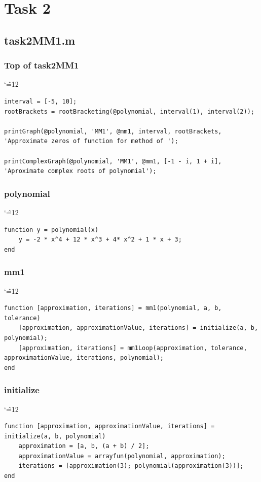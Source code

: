 \documentclass[12pt]{report}
\newenvironment{simplechar}{%
   \catcode`\^=12
}{}
\begin{document}
\newpage
\section{Task 2}

\subsection{task2MM1.m}

\subsubsection{Top of task2MM1}
\begin{simplechar}
\begin{lstlisting}
interval = [-5, 10];
rootBrackets = rootBracketing(@polynomial, interval(1), interval(2));

printGraph(@polynomial, 'MM1', @mm1, interval, rootBrackets, 'Approximate zeros of function for method of ');

printComplexGraph(@polynomial, 'MM1', @mm1, [-1 - i, 1 + i], 'Aproximate complex roots of polynomial');
\end{lstlisting}
\end{simplechar}

\subsubsection{polynomial}
\begin{simplechar}
\begin{lstlisting}
function y = polynomial(x)
    y = -2 * x^4 + 12 * x^3 + 4* x^2 + 1 * x + 3;
end
\end{lstlisting}
\end{simplechar}

\subsubsection{mm1}
\begin{simplechar}
\begin{lstlisting}
function [approximation, iterations] = mm1(polynomial, a, b, tolerance)
    [approximation, approximationValue, iterations] = initialize(a, b, polynomial);
    [approximation, iterations] = mm1Loop(approximation, tolerance, approximationValue, iterations, polynomial);
end
\end{lstlisting}
\end{simplechar}

\newpage
\subsubsection{initialize}
\begin{simplechar}
\begin{lstlisting}
function [approximation, approximationValue, iterations] = initialize(a, b, polynomial)
    approximation = [a, b, (a + b) / 2];
    approximationValue = arrayfun(polynomial, approximation);
    iterations = [approximation(3); polynomial(approximation(3))];
end
\end{lstlisting}
\end{simplechar}
\end{document}
